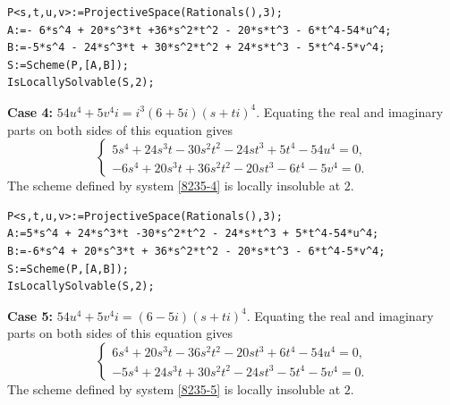 \documentclass[a4paper,12pt,english,reqno]{amsart}
\begin{document}
\begin{lstlisting}
P<s,t,u,v>:=ProjectiveSpace(Rationals(),3);
A:=- 6*s^4 + 20*s^3*t +36*s^2*t^2 - 20*s*t^3 - 6*t^4-54*u^4;
B:=-5*s^4 - 24*s^3*t + 30*s^2*t^2 + 24*s*t^3 - 5*t^4-5*v^4;
S:=Scheme(P,[A,B]);
IsLocallySolvable(S,2);
\end{lstlisting}


{\bf Case 4:} $54u^4+5v^4i=i^3(6+5i)(s+ti)^4$. Equating the real and imaginary parts on both sides of this equation gives
\begin{equation}\label{8235-4}
\begin{cases}
5s^4 + 24s^3t - 30s^2t^2 - 24st^3 + 5t^4 - 54u^4=0,\\
-6s^4 + 20s^3t + 36s^2t^2 - 20st^3 - 6t^4 - 5v^4=0.
\end{cases}
\end{equation}
The scheme defined by system \eqref{8235-4} is locally insoluble at $2$.


\begin{lstlisting}
P<s,t,u,v>:=ProjectiveSpace(Rationals(),3);
A:=5*s^4 + 24*s^3*t -30*s^2*t^2 - 24*s*t^3 + 5*t^4-54*u^4;
B:=-6*s^4 + 20*s^3*t + 36*s^2*t^2 - 20*s*t^3 - 6*t^4-5*v^4;
S:=Scheme(P,[A,B]);
IsLocallySolvable(S,2);
\end{lstlisting}


{\bf Case 5:} $54u^4+5v^4i=(6-5i)(s+ti)^4$. Equating the real and imaginary parts on both sides of this equation gives
\begin{equation}\label{8235-5}
\begin{cases}
6s^4 + 20s^3t - 36s^2t^2 - 20st^3 + 6t^4 - 54u^4=0,\\
-5s^4 + 24s^3t + 30s^2t^2 - 24st^3 - 5t^4 - 5v^4=0.
\end{cases}
\end{equation}
The scheme defined by system \eqref{8235-5} is locally insoluble at $2$.

\end{document}
